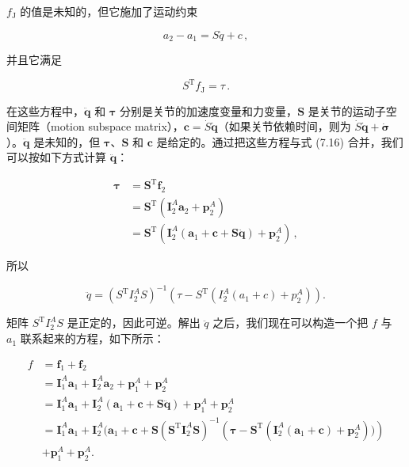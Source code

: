\documentclass[10pt,a4paper]{book}
\theoremstyle{thmstyle} %
\theoremstyle{defstyle} %
\theoremstyle{prostyle} %
\begin{document}
$f_{\mathrm{J}}$ 的值是未知的，但它施加了运动约束



$$
a _ { 2 } - a _ { 1 } = S \ddot { q } + c \, ,
$$



并且它满足



$$
S ^{\mathrm { T} } f _ { \mathrm { J } } = \tau \, .
$$



在这些方程中，$\ddot{\boldsymbol{q}}$ 和 $\boldsymbol{\tau}$ 分别是关节的加速度变量和力变量，$\boldsymbol{S}$ 是关节的运动子空间矩阵（motion subspace matrix），$\boldsymbol{c}=\dot{S}\dot{\boldsymbol{q}}$（如果关节依赖时间，则为 $\dot{S}\dot{\boldsymbol{q}}+\dot{\boldsymbol{\sigma}}$）。$\ddot{\boldsymbol{q}}$ 是未知的，但 $\boldsymbol{\tau}$、$\boldsymbol{S}$ 和 $\boldsymbol{c}$ 是给定的。通过把这些方程与式 (7.16) 合并，我们可以按如下方式计算 $\ddot{\boldsymbol{q}}$：



$$
\begin{array}{rl} { \boldsymbol{ \tau } } & { = \boldsymbol{ S } ^{\mathrm { T} } \boldsymbol{ f } _ { 2 } } \\& { = \boldsymbol{ S } ^{\mathrm { T} } ( \boldsymbol{ I } _ { 2 } ^{A} \boldsymbol{ a } _ { 2 } + \boldsymbol{ p } _ { 2 } ^{A} ) } \\& { = \boldsymbol{ S } ^{\mathrm { T} } ( \boldsymbol{ I } _ { 2 } ^{A} ( \boldsymbol{ a } _ { 1 } + \boldsymbol{ c } + \boldsymbol{ S } \ddot { \boldsymbol{ q } } ) + \boldsymbol{ p } _ { 2 } ^{A} ) \, , } \end{array}
$$



所以



$$
\ddot { q } = \left( S ^{\mathrm { T} } I _ { 2 } ^{A} S \right) ^{- 1} \left( \tau - S ^{\mathrm { T} } ( I _ { 2 } ^{A} ( a _ { 1 } + c ) + p _ { 2 } ^{A} ) \right) .
$$



矩阵 $S^{\mathrm{T}}I_{2}^{A}S$ 是正定的，因此可逆。解出 $\ddot{q}$ 之后，我们现在可以构造一个把 $f$ 与 $a_{1}$ 联系起来的方程，如下所示：



$$
\begin{aligned}f&=\boldsymbol{f}_1+\boldsymbol{f}_2\\&=\boldsymbol{I}_1^A\boldsymbol{a}_1+\boldsymbol{I}_2^A\boldsymbol{a}_2+\boldsymbol{p}_1^A+\boldsymbol{p}_2^A\\&=\boldsymbol{I}_1^A\boldsymbol{a}_1+\boldsymbol{I}_2^A(\boldsymbol{a}_1+\boldsymbol{c}+\boldsymbol{S}\ddot{\boldsymbol{q}})+\boldsymbol{p}_1^A+\boldsymbol{p}_2^A\\&=\boldsymbol{I}_1^A\boldsymbol{a}_1+\boldsymbol{I}_2^A(\boldsymbol{a}_1+\boldsymbol{c}+\boldsymbol{S}\left(\boldsymbol{S}^\mathrm{T}\boldsymbol{I}_2^A\boldsymbol{S}\right)^{-1}\left(\boldsymbol{\tau}-\boldsymbol{S}^\mathrm{T}(\boldsymbol{I}_2^A(\boldsymbol{a}_1+\boldsymbol{c})+\boldsymbol{p}_2^A))\right)\\&+\boldsymbol{p}_1^A+\boldsymbol{p}_2^A.\end{aligned}
$$
\end{document}
